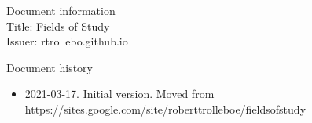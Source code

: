 {\tiny
Document information\\

Title: Fields of Study\\
Issuer: rtrollebo.github.io

Document history
\begin{itemize}
\item 2021-03-17. Initial version. Moved from https://sites.google.com/site/roberttrolleboe/fieldsofstudy
\end{itemize}

}

\newpage

